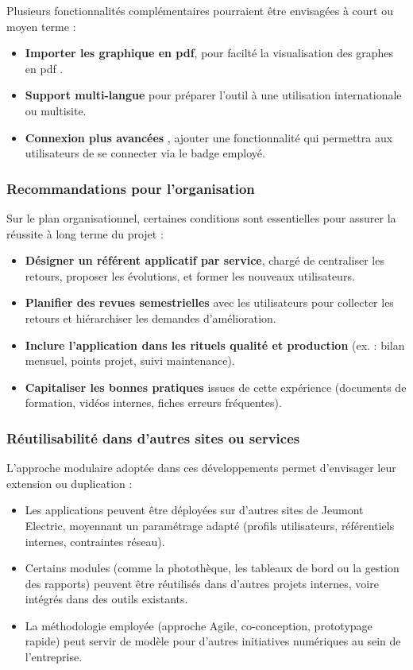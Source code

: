 \documentclass[11pt,a4paper]{article}
\begin{document}
Plusieurs fonctionnalités complémentaires pourraient être envisagées à court ou moyen terme :

\begin{itemize}
    \item \textbf{Importer les graphique en pdf}, pour facilté la visualisation des graphes en pdf .
    \item \textbf{Support multi-langue} pour préparer l’outil à une utilisation internationale ou multisite.
    \item \textbf{Connexion plus avancées} , ajouter une fonctionnalité qui permettra aux utilisateurs de se connecter via le badge employé.
\end{itemize}

\subsubsection{Recommandations pour l’organisation}

Sur le plan organisationnel, certaines conditions sont essentielles pour assurer la réussite à long terme du projet :

\begin{itemize}
    \item \textbf{Désigner un référent applicatif par service}, chargé de centraliser les retours, proposer les évolutions, et former les nouveaux utilisateurs.
    \item \textbf{Planifier des revues semestrielles} avec les utilisateurs pour collecter les retours et hiérarchiser les demandes d’amélioration.
    \item \textbf{Inclure l’application dans les rituels qualité et production} (ex. : bilan mensuel, points projet, suivi maintenance).
    \item \textbf{Capitaliser les bonnes pratiques} issues de cette expérience (documents de formation, vidéos internes, fiches erreurs fréquentes).
\end{itemize}

\subsubsection{Réutilisabilité dans d’autres sites ou services}

L’approche modulaire adoptée dans ces développements permet d’envisager leur extension ou duplication :

\begin{itemize}
    \item Les applications peuvent être déployées sur d’autres sites de Jeumont Electric, moyennant un paramétrage adapté (profils utilisateurs, référentiels internes, contraintes réseau).
    \item Certains modules (comme la photothèque, les tableaux de bord ou la gestion des rapports) peuvent être réutilisés dans d’autres projets internes, voire intégrés dans des outils existants.
    \item La méthodologie employée (approche Agile, co-conception, prototypage rapide) peut servir de modèle pour d’autres initiatives numériques au sein de l’entreprise.
\end{itemize}
\end{document}
